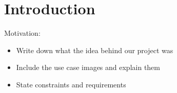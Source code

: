 \chapter{Introduction}
\label{cha:introduction}

Motivation:
\begin{itemize}
    \item Write down what the idea behind our project was
    \item Include the use case images and explain them
    \item State constraints and requirements
\end{itemize}

\hline
